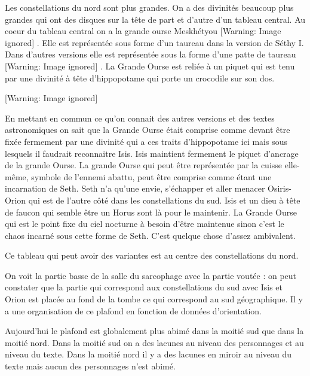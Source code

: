\documentclass{article}
\begin{document}
Les constellations du nord sont plus grandes. On a des divinités
beaucoup plus grandes qui ont des disques sur la tête de part et
d’autre d’un tableau central. Au coeur du tableau central on a la
grande ourse Meskhétyou   [Warning: Image ignored]
  . Elle est représentée sous forme d’un taureau dans la version de
Séthy I. Dans d’autres versions elle est représentée sous la forme
d’une patte de taureau    [Warning: Image ignored]
 . La Grande Ourse est reliée à un piquet qui est tenu par une divinité
à tête d’hippopotame qui porte un crocodile sur son dos. 

  [Warning: Image ignored] %
 

En mettant en commun ce qu’on connait des autres versions et des textes
astronomiques on sait que la Grande Ourse était comprise comme devant
être fixée fermement par une divinité qui a ces traits d’hippopotame
ici mais sous lesquels il faudrait reconnaitre Isis. Isis maintient
fermement le piquet d’ancrage de la grande Ourse. La grande Ourse qui
peut être représentée par la cuisse elle-même, symbole de l’ennemi
abattu, peut être comprise comme étant une incarnation de Seth. Seth
n’a qu’une envie, s’échapper et aller menacer Osiris-Orion qui est de
l’autre côté dans les constellations du sud. Isis et un dieu à tête de
faucon qui semble être un Horus sont là pour le maintenir. La Grande
Ourse qui est le point fixe du ciel nocturne à besoin d’être maintenue
sinon c’est le chaos incarné sous cette forme de Seth. C’est quelque
chose d’assez ambivalent.

Ce tableau qui peut avoir des variantes est au centre des constellations
du nord.

On voit la partie basse de la salle du sarcophage avec la partie voutée
: on peut constater que la partie qui correspond aux constellations du
sud avec Isis et Orion est placée au fond de la tombe ce qui correspond
au sud géographique. Il y a une organisation de ce plafond en fonction
de données d’orientation.

\begin{figure}[htp]

\end{figure}
Aujourd’hui le plafond est globalement plus abimé dans la moitié sud que
dans la moitié nord. Dans la moitié sud on a des lacunes au niveau des
personnages et au niveau du texte. Dans la moitié nord il y a des
lacunes en miroir au niveau du texte mais aucun des personnages n’est
abimé.
\end{document}
